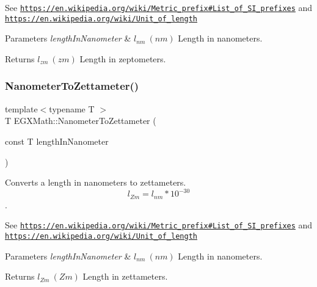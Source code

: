 See \href{https://en.wikipedia.org/wiki/Metric_prefix#List_of_SI_prefixes}{\tt https\+://en.\+wikipedia.\+org/wiki/\+Metric\+\_\+prefix\#\+List\+\_\+of\+\_\+\+S\+I\+\_\+prefixes} and \href{https://en.wikipedia.org/wiki/Unit_of_length}{\tt https\+://en.\+wikipedia.\+org/wiki/\+Unit\+\_\+of\+\_\+length} 
\begin{DoxyParams}{Parameters}
{\em length\+In\+Nanometer} & $ l_{nm}\ (nm)$ Length in nanometers. \\
\hline
\end{DoxyParams}
\begin{DoxyReturn}{Returns}
$ l_{zm}\ (zm)$ Length in zeptometers. 
\end{DoxyReturn}
\mbox{\label{group___e_g_x_math-_conversions-_length_conversions-_s_i-_nanometer-_s_i_ga3306731dd581f22ad9203923e4a03d2a}} 
\subsubsection{\texorpdfstring{Nanometer\+To\+Zettameter()}{NanometerToZettameter()}}
{\footnotesize\ttfamily template$<$typename T $>$ \\
T E\+G\+X\+Math\+::\+Nanometer\+To\+Zettameter (\begin{DoxyParamCaption}\item[{const T}]{length\+In\+Nanometer }\end{DoxyParamCaption})}



Converts a length in nanometers to zettameters. \[ l_{Zm}=l_{nm} * 10^{-30} \]. 

See \href{https://en.wikipedia.org/wiki/Metric_prefix#List_of_SI_prefixes}{\tt https\+://en.\+wikipedia.\+org/wiki/\+Metric\+\_\+prefix\#\+List\+\_\+of\+\_\+\+S\+I\+\_\+prefixes} and \href{https://en.wikipedia.org/wiki/Unit_of_length}{\tt https\+://en.\+wikipedia.\+org/wiki/\+Unit\+\_\+of\+\_\+length} 
\begin{DoxyParams}{Parameters}
{\em length\+In\+Nanometer} & $ l_{nm}\ (nm)$ Length in nanometers. \\
\hline
\end{DoxyParams}
\begin{DoxyReturn}{Returns}
$ l_{Zm}\ (Zm)$ Length in zettameters. 
\end{DoxyReturn}
